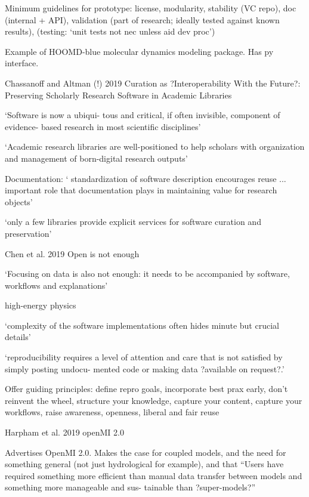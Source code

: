 \documentclass[12pt]{amsart}
\begin{document}
Minimum guidelines for prototype: license, modularity, stability (VC repo), doc (internal + API), validation (part of research; ideally tested against known results), (testing: `unit tests not nec unless aid dev proc')

Example of HOOMD-blue molecular dynamics modeling package. Has py interface. 



Chassanoff and Altman (!) 2019 Curation as ?Interoperability With the Future?: Preserving Scholarly Research Software in Academic Libraries

`Software is now a ubiqui- tous and critical, if often invisible, component of evidence- based research in most scientific disciplines'

`Academic research libraries are well-positioned to help scholars with organization and management of born-digital research outputs'

Documentation: ` standardization of software description encourages reuse ... important role that documentation plays in maintaining value for research objects'

`only a few libraries provide explicit services for software curation and preservation'



Chen et al. 2019 Open is not enough

`Focusing on data is also not enough: it needs to be accompanied by software, workflows and explanations'

high-energy physics

`complexity of the software implementations often hides minute but crucial details'

`reproducibility requires a level of attention and care that is not satisfied by simply posting undocu- mented code or making data ?available on request?.'

Offer guiding principles: define repro goals, incorporate best prax early, don't reinvent the wheel, structure your knowledge, capture your content, capture your workflows, raise awareness, openness, liberal and fair reuse



Harpham et al. 2019 openMI 2.0

Advertises OpenMI 2.0. Makes the case for coupled models, and the need for something general (not just hydrological for example), and that ``Users have required something more efficient than manual data transfer between models and something more manageable and sus- tainable than ?super-models?''
\end{document}
